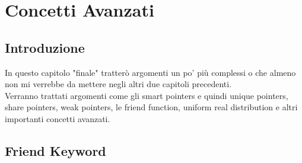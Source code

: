 
\chapter{Concetti Avanzati}











\section{Introduzione}

\textsf{\small In questo capitolo "finale" tratterò argomenti un po' più complessi o che almeno non mi verrebbe da mettere negli altri due capitoli precedenti.} \\

\textsf{\small Verranno trattati argomenti come gli smart pointers e quindi unique pointers, share pointers, weak pointers, le friend function, uniform real distribution e altri importanti concetti avanzati.} \\


\newpage

\section{Friend Keyword}

